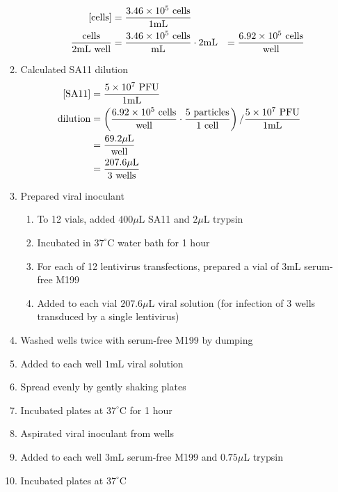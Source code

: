 \begin{enumerate}
\begin{enumerate}
\begin{enumerate}
					\begin{align*}
					\text{[cells]} &= \frac{3.46\times 10^{5}\text{ cells}}{1\text{mL}} \\
					\frac{\text{cells}}{2\text{mL well}} &= \frac{3.46\times 10^{5}\text{ cells}}{\text{mL}} \cdot 2\text{mL} &= \frac{6.92\times 10^{5}\text{ cells}}{\text{well}}\\
					\end{align*}
				\end{enumerate}
			\item Calculated SA11 dilution
				\begin{align*}
					\text{[SA11]} &= \frac{5\times 10^{7}\text{ PFU}}{1\text{mL}}\\
					\text{dilution}&= \left(\frac{6.92\times 10^{5}\text{ cells}}{\text{well}}\cdot \frac{5\text{ particles}}{1\text{ cell}}\right)/\frac{5\times 10^{7}\text{ PFU}}{1\text{mL}}\\
					&= \frac{69.2\mu\text{L}}{\text{well}}\\
					&= \frac{207.6\mu\text{L}}{3\text{ wells}}
				\end{align*}
			\item Prepared viral inoculant
				\begin{enumerate}
					\item To 12 vials, added $400\mu$L SA11 and $2\mu$L trypsin
					\item Incubated in $37^{\circ}$C water bath for 1 hour
					\item For each of 12 lentivirus transfections, prepared a vial of $3$mL serum-free M199
					\item Added to each vial $207.6\mu$L viral solution (for infection of 3 wells transduced by a single lentivirus)
				\end{enumerate}
			\item Washed wells twice with serum-free M199 by dumping
			\item Added to each well $1$mL viral solution
			\item Spread evenly by gently shaking plates
			\item Incubated plates at $37^{\circ}$C for 1 hour
			\item Aspirated viral inoculant from wells
			\item Added to each well $3$mL serum-free M199 and $0.75\mu$L trypsin
			\item Incubated plates at $37^{\circ}$C
		\end{enumerate}
\end{enumerate}

